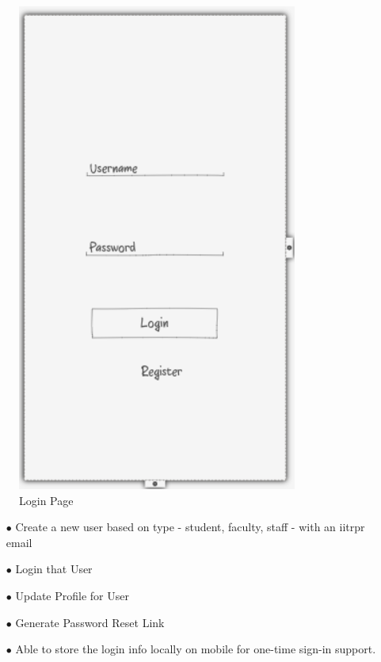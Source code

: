 \documentclass{article}
\begin{document}
\begin{figure}[h]
    \centering
    \includegraphics[scale=0.3]{Login.png}
    \caption{Login Page}
\end{figure}

\begin{itemize}
\item[$\bullet$] Create a new user based on type - student, faculty, staff - with an iitrpr email
\item[$\bullet$] Login that User
\item[$\bullet$] Update Profile for User
\item[$\bullet$] Generate Password Reset Link
\item[$\bullet$] Able to store the login info locally on mobile for one-time sign-in support.

\end{itemize}
\end{document}
